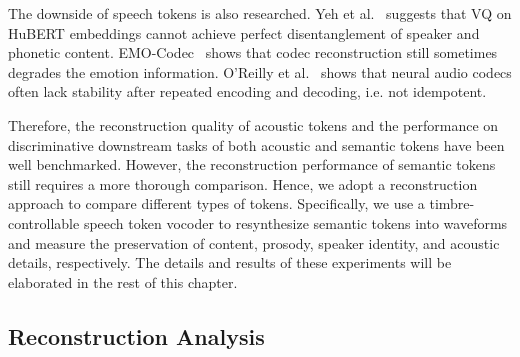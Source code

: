 The downside of speech tokens is also researched.
Yeh et al.~\cite{yeh2024estimating} suggests that VQ on HuBERT embeddings cannot achieve perfect disentanglement of speaker and phonetic content. 
EMO-Codec~\cite{ren2024emo} shows that codec reconstruction still sometimes degrades the emotion information.
O'Reilly et al.~\cite{o2024code} shows that neural audio codecs often lack stability after repeated encoding and decoding, i.e. not idempotent.

Therefore, the reconstruction quality of acoustic tokens and the performance on discriminative downstream tasks of both acoustic and semantic tokens have been well benchmarked.
However, the reconstruction performance of semantic tokens still requires a more thorough comparison.
Hence, we adopt a reconstruction approach to compare different types of tokens.
Specifically, we use a timbre-controllable speech token vocoder to resynthesize semantic tokens into waveforms and measure the preservation of content, prosody, speaker identity, and acoustic details, respectively. The details and results of these experiments will be elaborated in the rest of this chapter.

\IEEEpubidadjcol


\subsection{Reconstruction Analysis}
\label{sec:reconstruction}


